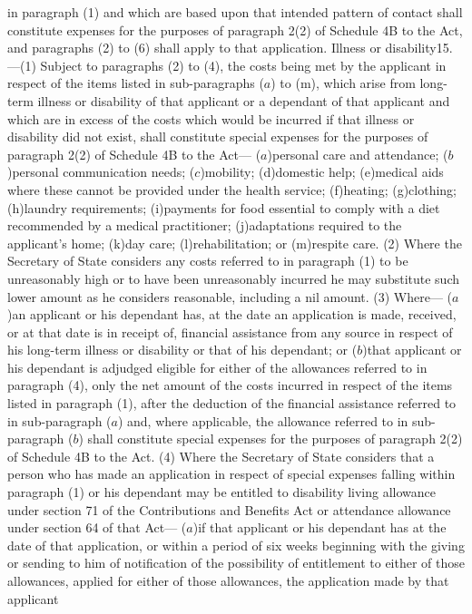 \documentclass[a4paper]{article}
\begin{document}
in paragraph (1) and which are based upon that intended pattern of contact shall
constitute expenses for the purposes of paragraph 2(2) of Schedule 4B to the
Act, and paragraphs (2) to (6) shall apply to that application.
Illness or disability15.—(1) Subject to paragraphs (2) to (4), the costs being
met by the applicant in respect of the items listed in sub-paragraphs ($a$) to
(m), which arise from long-term illness or disability of that applicant or a
dependant of that applicant and which are in excess of the costs which would be
incurred if that illness or disability did not exist, shall constitute special
expenses for the purposes of paragraph 2(2) of Schedule 4B to the Act—
($a$)personal care and attendance;
($b$)personal communication needs;
($c$)mobility;
(d)domestic help;
(e)medical aids where these cannot be provided under the health service;
(f)heating;
(g)clothing;
(h)laundry requirements;
(i)payments for food essential to comply with a diet recommended by a medical
practitioner;
(j)adaptations required to the applicant’s home;
(k)day care;
(l)rehabilitation; or
(m)respite care.
(2) Where the Secretary of State considers any costs referred to in paragraph
(1) to be unreasonably high or to have been unreasonably incurred he may
substitute such lower amount as he considers reasonable, including a nil amount.
(3) Where—
($a$)an applicant or his dependant has, at the date an application is made,
received, or at that date is in receipt of, financial assistance from any source
in respect of his long-term illness or disability or that of his dependant; or
($b$)that applicant or his dependant is adjudged eligible for either of the
allowances referred to in paragraph (4),
only the net amount of the costs incurred in respect of the items listed in
paragraph (1), after the deduction of the financial assistance referred to in
sub-paragraph ($a$) and, where applicable, the allowance referred to in
sub-paragraph ($b$) shall constitute special expenses for the purposes of
paragraph 2(2) of Schedule 4B to the Act.
(4) Where the Secretary of State considers that a person who has made an
application in respect of special expenses falling within paragraph (1) or his
dependant may be entitled to disability living allowance under section 71 of the
Contributions and Benefits Act or attendance allowance under section 64 of that
Act—
($a$)if that applicant or his dependant has at the date of that application, or
within a period of six weeks beginning with the giving or sending to him of
notification of the possibility of entitlement to either of those allowances,
applied for either of those allowances, the application made by that applicant
\end{document}
